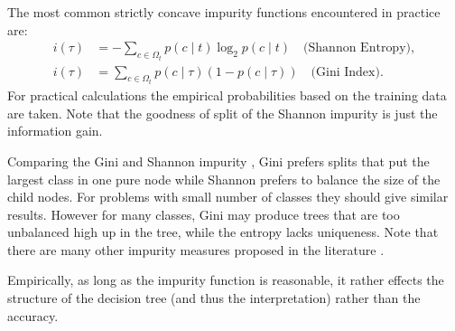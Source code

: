 \documentclass[12pt,a4paper]{article}
\begin{document}
The most common strictly concave impurity functions encountered in practice are:
	\begin{align}
    i(\tau) &= - \sum_{c \in \Omega_t} p(c \mid t) \log_2 p(c \mid t) \quad \text{(Shannon Entropy)} \label{eq:shannon_impurity}, \\ 
    i(\tau) &= \sum_{c \in \Omega_t} p(c \mid \tau) (1 - p(c \mid \tau)) \quad \text{(Gini Index)} \label{eq:gini_impurity}.
    \end{align}
For practical calculations the empirical probabilities based on the training data are taken. Note that the goodness of split of the Shannon impurity is just the information gain. 

Comparing the Gini and Shannon impurity \cite{Breiman1996}, Gini prefers splits that put the largest class in one pure node while Shannon prefers to balance the size of the child nodes. For problems with small number of classes they should give similar results. However for many classes, Gini may produce trees that are too unbalanced high up in the tree, while the entropy lacks uniqueness. Note that there are many other impurity measures proposed in the literature \cite{gini_vs_twoing, epub1833,  BERZAL200331}. 

Empirically, as long as the impurity function is reasonable, it rather effects the structure of the decision tree (and thus the interpretation) rather than the accuracy.
\end{document}
